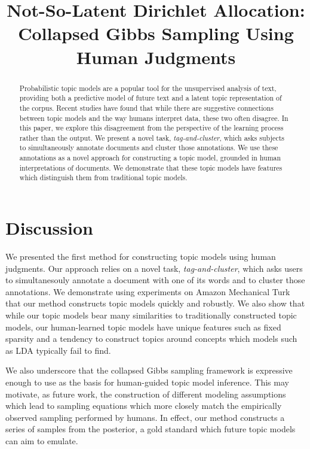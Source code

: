 \documentclass[11pt,letterpaper]{article}
\title{Not-So-Latent Dirichlet Allocation: \\ 
       Collapsed Gibbs Sampling Using Human Judgments}
\author{}
\begin{document}
\maketitle
\vspace{-.1in}
\begin{abstract}%
  Probabilistic topic models are a popular tool for the unsupervised
  analysis of text, providing both a predictive model of future text
  and a latent topic representation of the corpus.  Recent studies
  have found that while there are suggestive connections between topic
  models and the way humans interpret data, these two often disagree.
  In this paper, we explore this disagreement from the perspective of
  the learning process rather than the output.  We present a novel
  task, \emph{tag-and-cluster}, which asks subjects to simultaneously
  annotate documents and cluster those annotations.  We use these
  annotations as a novel approach for constructing a topic model,
  grounded in human interpretations of documents.  We demonstrate that
  these topic models have features which distinguish them from
  traditional topic models.
\end{abstract}





\section{Discussion}
  We presented the first method for constructing topic models using
  human judgments.  Our approach relies on a novel task,
  \emph{tag-and-cluster}, which asks users to simultanesouly annotate
  a document with one of its words and to cluster those annotations.
  We demonstrate using experiments on Amazon Mechanical Turk that our
  method constructs topic models quickly and robustly.  We also show
  that while our topic models bear many similarities to traditionally
  constructed topic models, our human-learned topic models have unique
  features such as fixed sparsity and a tendency to construct topics
  around concepts which models such as LDA typically fail to find.

  We also underscore that the collapsed Gibbs sampling framework is
  expressive enough to use as the basis for human-guided topic model
  inference.  This may motivate, as future work, the construction of
  different modeling assumptions which lead to sampling equations
  which more closely match the empirically observed sampling performed
  by humans.  In effect, our method constructs a series of samples
  from the posterior, a gold standard which future topic models can
  aim to emulate.

{\footnotesize

}
\end{document}

